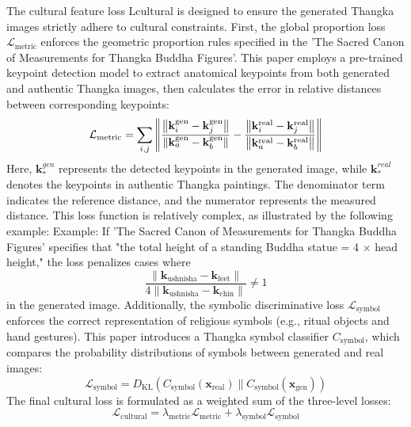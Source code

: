 \documentclass[sn-mathphys]{sn-jnl}%
\theoremstyle{thmstyleone}%
\theoremstyle{thmstyletwo}%
\theoremstyle{thmstylethree}%
\begin{document}
The cultural feature loss Lcultural is designed to ensure the generated Thangka images strictly adhere to cultural constraints. First, the global proportion loss $\mathcal{L}_{\text{metric}}$ enforces the geometric proportion rules specified in the 'The Sacred Canon of Measurements for Thangka Buddha Figures'. This paper employs a pre-trained keypoint detection model to extract anatomical keypoints from both generated and authentic Thangka images, then calculates the error in relative distances between corresponding keypoints:
\begin{equation}
	{\mathcal{L}_{{\rm{metric}}}} = \sum\limits_{i,j} {\left\| {\frac{{\left\| {{\bf{k}}_i^{{\rm{gen}}} - {\bf{k}}_j^{{\rm{gen}}}} \right\|}}{{\left\| {{\bf{k}}_a^{{\rm{gen}}} - {\bf{k}}_b^{{\rm{gen}}}} \right\|}} - \frac{{\left\| {{\bf{k}}_i^{{\rm{real}}} - {\bf{k}}_j^{{\rm{real}}}} \right\|}}{{\left\| {{\bf{k}}_a^{{\rm{real}}} - {\bf{k}}_b^{{\rm{real}}}} \right\|}}} \right\|} 
	\label{eq18}
\end{equation}
Here, $\textbf{k}_*^{gen}$ represents the detected keypoints in the generated image, while $\textbf{k}_*^{real}$ denotes the keypoints in authentic Thangka paintings. The denominator term indicates the reference distance, and the numerator represents the measured distance. This loss function is relatively complex, as illustrated by the following example: 
Example: If 'The Sacred Canon of Measurements for Thangka Buddha Figures' specifies that "the total height of a standing Buddha statue = 4 × head height," the loss penalizes cases where $$\frac{\|\mathbf{k}_{\text{ushnisha}}-\mathbf{k}_{\text{feet}}\|}{4\|\mathbf{k}_{\text{ushnisha}}-\mathbf{k}_{\text{chin}}\|} \neq 1$$ in the generated image.
Additionally, the symbolic discriminative loss \(\mathcal{L}_{\text{symbol}}\) enforces the correct representation of religious symbols (e.g., ritual objects and hand gestures). This paper introduces a Thangka symbol classifier \(C_{\text{symbol}}\), which compares the probability distributions of symbols between generated and real images:
\begin{equation}
	\mathcal{L}_{\mathrm{symbol}}=D_{\mathrm{KL}}(C_{\mathrm{symbol}}(\mathbf{x}_{\mathrm{real}})\|C_{\mathrm{symbol}}(\mathbf{x}_{\mathrm{gen}}))
	\label{eq19}
\end{equation}
The final cultural loss is formulated as a weighted sum of the three-level losses:
\begin{equation}
	\mathcal{L}_{\mathrm{cultural}}=\lambda_{\mathrm{metric}}\mathcal{L}_{\mathrm{metric}}+\lambda_{\mathrm{symbol}}\mathcal{L}_{\mathrm{symbol}}
	\label{eq20}
\end{equation}
\end{document}
